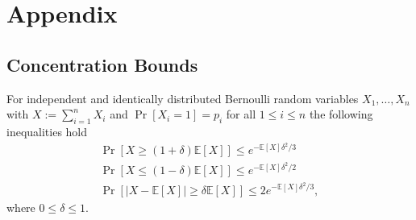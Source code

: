 \chapter{Appendix}
\section{Concentration Bounds}
\begin{lemma}
For independent and identically distributed Bernoulli random variables $X_1, \dotsc, X_n$ with $X := \sum_{i=1}^n X_i$
and $\Pr[X_i = 1] = p_i$ for all $ 1 \leq  i \leq n$ the following inequalities hold
\begin{gather}
\label{ineq:ch0}
\Pr[X \geq (1+\delta) \mathbb{E}[X]] \leq e^{- \mathbb{E}[X] \delta^2/3} \\
\label{ineq:ch1}
\Pr[X \leq (1-\delta) \mathbb{E}[X]] \leq e^{- \mathbb{E}[X] \delta^2/2} \\
\label{ineq:ch2}
\Pr[|X - \mathbb{E}[X]| \geq \delta \mathbb{E}[X]] \leq 2 e^{- \mathbb{E}[X] \delta^2 / 3},
\end{gather}
where $0 \leq \delta \leq 1$.
\end{lemma}
\vspace*{\fill}
\pagebreak

